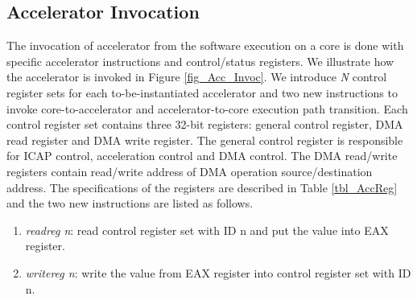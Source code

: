 \subsection{Accelerator Invocation}

The invocation of accelerator from the software execution on a core is
done with specific accelerator instructions and control/status
registers. We illustrate how the accelerator is invoked in Figure
\ref{fig_Acc_Invoc}. We introduce {\em N} control register sets for
each to-be-instantiated accelerator and two new instructions to
invoke core-to-accelerator and accelerator-to-core execution path
transition. Each control register set contains three 32-bit registers:
general control register, DMA read register and DMA write
register. The general control register is responsible for ICAP control,
acceleration control and DMA control. The DMA read/write registers
contain read/write address of DMA operation source/destination
address. The specifications of the registers are described in Table
\ref{tbl_AccReg} and the two new instructions are listed as follows.

\begin{enumerate}
\item{\em readreg n}: read control register set with ID n and put the value into EAX register.
\item{\em writereg n}: write the value from EAX register into control register set with ID n.
\end{enumerate}

